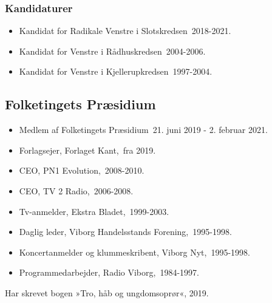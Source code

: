 \documentclass[11pt, a4paper]{awesome-cv}
\begin{document}
\begin{cvletter}
\subsubsection*{Kandidaturer}
\begin{itemize}
\item Kandidat for Radikale Venstre i Slotskredsen 2018-2021.
\item Kandidat for Venstre i Rådhuskredsen 2004-2006.
\item Kandidat for Venstre i Kjellerupkredsen 1997-2004.
\end{itemize}
\subsection*{Folketingets Præsidium}
\begin{itemize}
\item Medlem af Folketingets Præsidium 21. juni 2019 - 2. februar 2021.
\end{itemize}
\begin{itemize}
\item Forlagsejer, Forlaget Kant, fra 2019.
\item CEO, PN1 Evolution, 2008-2010.
\item CEO, TV 2 Radio, 2006-2008.
\item Tv-anmelder, Ekstra Bladet, 1999-2003.
\item Daglig leder, Viborg Handelsstands Forening, 1995-1998.
\item Koncertanmelder og klummeskribent, Viborg Nyt, 1995-1998.
\item Programmedarbejder, Radio Viborg, 1984-1997.
\end{itemize}
Har skrevet bogen »Tro, håb og ungdomsoprør«, 2019.

\end{cvletter}
\end{document}
